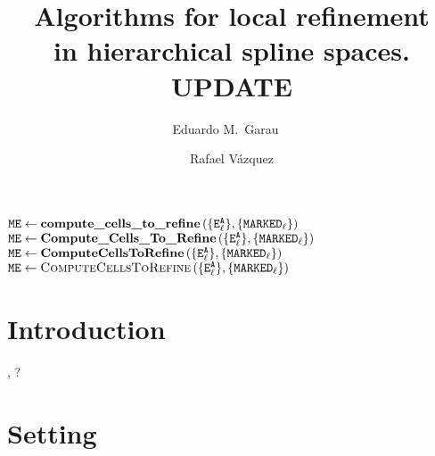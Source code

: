 \documentclass[a4paper]{siamltex1213}
\title{Algorithms for local refinement \\ in hierarchical spline spaces. {\Rd UPDATE}}
\author{Eduardo M.~Garau\footnotemark[1]\ \footnotemark[2]\ \footnotemark[3] \and Rafael V\'azquez\footnotemark[1]}
\newcommand{\snote}[1]{\fbox{\textbf{#1}}}
\newcommand{\activeelements}[1]{\tt E^A_{#1}}
\DeclareMathOperator\marked{\tt MARKED}
\DeclareMathOperator\markedelements{\tt ME}
\begin{document}
\maketitle

\renewcommand{\thefootnote}{\fnsymbol{footnote}}
\renewcommand{\thefootnote}{\arabic{footnote}}

% 
%  
% 
% 



\begin{algorithm}
\begin{algorithmic}
\State $\markedelements \gets \textbf{compute\_cells\_to\_refine} \, (\{\activeelements{\ell}\}, \{\marked_\ell\})$
\State $\markedelements \gets \textbf{Compute\_Cells\_To\_Refine} \, (\{\activeelements{\ell}\}, \{\marked_\ell\})$
\State $\markedelements \gets \textbf{ComputeCellsToRefine} \, (\{\activeelements{\ell}\}, \{\marked_\ell\})$
\State $\markedelements \gets \textsc{ComputeCellsToRefine} \, (\{\activeelements{\ell}\}, \{\marked_\ell\})$
\end{algorithmic}
\end{algorithm}

\section{Introduction}
\cite{Scott2014222,Bornemann2013584}, \cite{KGJ14}?

\section{Setting}
\end{document}
